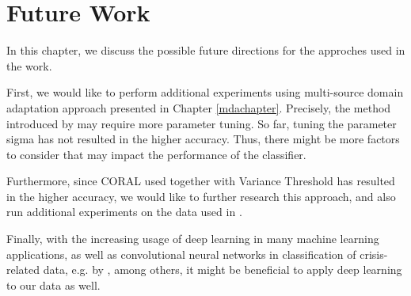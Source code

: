 \cleardoublepage

\chapter{Future Work}
\label{futureworkchapter}

In this chapter, we discuss the possible future directions for the approches used in the work. 

First, we would like to perform additional experiments using multi-source domain adaptation approach presented in Chapter \ref{mdachapter}. Precisely, the method introduced by \citet{mda} may require more parameter tuning. So far, tuning the parameter sigma has not resulted in the higher accuracy. Thus, there might be more factors to consider that may impact the performance of the classifier. 

Furthermore, since CORAL used together with Variance Threshold has resulted in the higher accuracy, we would like to further research this approach, and also run additional experiments on the data used in \citep{imran2016lrec}.

Finally, with the increasing usage of deep learning in many machine learning applications, as well as convolutional neural networks in classification of crisis-related data, e.g. by \citet{imran2016lrec}, among others, it might be beneficial to apply deep learning to our data as well.


